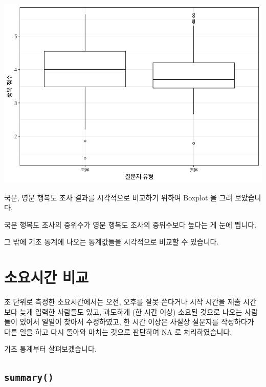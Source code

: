 \documentclass[
]{book}
\begin{document}
\includegraphics{Quiz_report_2025_files/figure-latex/unnamed-chunk-241-1.pdf}

국문, 영문 행복도 조사 결과를 시각적으로 비교하기 위하여 Boxplot 을 그려 보았습니다.

국문 행복도 조사의 중위수가 영문 행복도 조사의 중위수보다 높다는 게 눈에 띕니다.

그 밖에 기초 통계에 나오는 통계값들을 시각적으로 비교할 수 있습니다.

\section{소요시간 비교}\label{uxc18cuxc694uxc2dcuxac04-uxbe44uxad50}

초 단위로 측정한 소요시간에서는 오전, 오후를 잘못 쓴다거나 시작 시간을 제출 시간보다 늦게 입력한 사람들도 있고, 과도하게 (한 시간 이상) 소요된 것으로 나오는 사람들이 있어서 일일이 찾아서 수정하였고, 한 시간 이상은 사실상 설문지를 작성하다가 다른 일을 하고 다시 돌아와 마치는 것으로 판단하여 NA 로 처리하였습니다.

기초 통계부터 살펴보겠습니다.

\subsection{\texorpdfstring{\texttt{summary()}}{summary()}}\label{summary-2}
\end{document}
